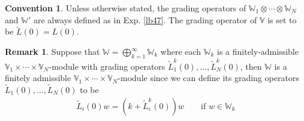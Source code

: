 \documentclass[11pt,b5paper,notitlepage]{article}
\theoremstyle{definition}
\newtheorem{rem}[df]{Remark}
\newtheorem{cv}[df]{Convention}
\theoremstyle{plain}
\newcommand{\wtd}{\widetilde}
\newcommand{\Vbb}{\mathbb V}
\newcommand{\Wbb}{\mathbb W}
\newcommand{\<}{\left\langle}
\renewcommand{\>}{\right\rangle}
\numberwithin{equation}{section}
\begin{document}
\begin{cv}
Unless otherwise stated, the grading operators of $\Wbb_1\otimes\cdots\otimes\Wbb_N$ and $\Wbb'$ are always defined as in Exp. \ref{lb47}. The grading operator of $\Vbb$ is set to be $\wtd L(0)=L(0)$.
\end{cv}

\begin{rem}\label{lb48}
Suppose that $\Wbb=\bigoplus_{k=1}^\infty \Wbb_k$ where each $\Wbb_k$ is a finitely-admissible $\Vbb_1\times\cdots\times\Vbb_N$-module with grading operators $\wtd L^k_1(0),\dots,\wtd L^k_N(0)$, then $\Wbb$ is a finitely admissible $\Vbb_1\times\cdots\times\Vbb_N$-module since we can define its grading operators $\wtd L_1(0),\dots,\wtd L_N(0)$ to be
\begin{align}
\wtd L_i(0)w=(k+\wtd L_i^k(0))w\qquad\text{if }w\in \Wbb_k
\end{align}
\end{rem}
\end{document}
